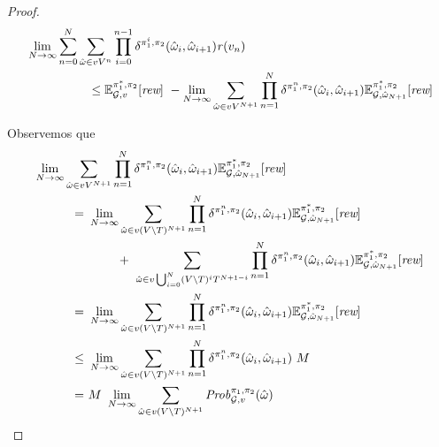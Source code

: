 \begin{proof}
  \begin{align}
    & \lim_{N \rightarrow \infty} \sum^{N}_{n=0}\sum_{\hat{\omega} \in vV^{n}} \prod^{n-1}_{i=0}\delta^{\pi_{1}^i,\pi_{2}}(\hat{\omega}_i, \hat{\omega}_{i+1}) \mathit{r}(v_n) \label{thm:semimarkov-to-memoryless-eq0}\\
    & \hspace{5em} \leq 
      \mathbb{E}^{\pi^*_{1}, \pi_{2}}_{\mathcal{G},v}[\textit{rew}] \ - \lim_{N \rightarrow \infty} \sum_{\hat{\omega} \in vV^{N+1}}\prod^{N}_{n=1}\delta^{\pi_{1}^n,\pi_{2}}(\hat{\omega}_i,\hat{\omega}_{i+1}) \mathbb{E}^{\pi^*_{1}, \pi_{2}}_{\mathcal{G}, \hat{\omega}_{N+1}}[\textit{rew}] \notag
  \end{align}

  Observemos que
  \begin{align}
    \lim_{N \rightarrow \infty} \sum_{\hat{\omega} \in vV^{N+1}}\prod^{N}_{n=1}\delta^{\strat{1}^n,\strat{2}}(\hat{\omega}_i,\hat{\omega}_{i+1}) \Expect{\starredstrat{1}}{\strat{2}}_{\StochG, \hat{\omega}_{N+1}}[\Rewards] \hspace{-16em} & \notag \\
    = \ & \lim_{N \rightarrow \infty} \sum_{\hat{\omega} \in v(V\setminus T)^{N+1}}\prod^{N}_{n=1}\delta^{\strat{1}^n,\strat{2}}(\hat{\omega}_i,\hat{\omega}_{i+1}) \Expect{\starredstrat{1}}{\strat{2}}_{\StochG, \hat{\omega}_{N+1}}[\Rewards] \label{thm:semimarkov-to-memoryless-lim-eq1}\\
    & \phantom{\lim_{N \rightarrow \infty}} + \
    \sum_{\hat{\omega} \in v\bigcup_{i=0}^N(V\setminus T)^iT^{N+1-i}}\prod^{N}_{n=1}\delta^{\strat{1}^n,\strat{2}}(\hat{\omega}_i,\hat{\omega}_{i+1}) \Expect{\starredstrat{1}}{\strat{2}}_{\StochG, \hat{\omega}_{N+1}}[\Rewards] \notag \\
    = \ & \lim_{N \rightarrow \infty} \sum_{\hat{\omega} \in v(V\setminus T)^{N+1}}\prod^{N}_{n=1}\delta^{\strat{1}^n,\strat{2}}(\hat{\omega}_i,\hat{\omega}_{i+1}) \Expect{\starredstrat{1}}{\strat{2}}_{\StochG, \hat{\omega}_{N+1}}[\Rewards] \label{thm:semimarkov-to-memoryless-lim-eq2}\\
    \leq \ & \lim_{N \rightarrow \infty} \sum_{\hat{\omega} \in v(V\setminus T)^{N+1}}\prod^{N}_{n=1}\delta^{\strat{1}^n,\strat{2}}(\hat{\omega}_i,\hat{\omega}_{i+1}) \ M \label{thm:semimarkov-to-memoryless-lim-eq3}\\
    = \ & M \ \lim_{N \rightarrow \infty} \sum_{\hat{\omega} \in v(V\setminus T)^{N+1}} \Prob{\strat{1}}{\strat{2}}_{\StochG,v}(\hat{\omega}) \label{thm:semimarkov-to-memoryless-lim-eq4}\\

\end{align}
\end{proof}
